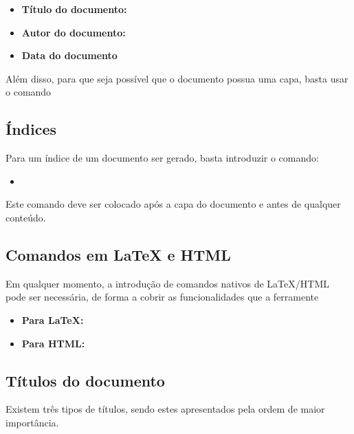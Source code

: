 \documentclass[11pt,a4paper]{article}
\begin{document}
\begin{itemize}
    \item \textbf{Título do documento:} 
        \verb@ %title Título @
    \item \textbf{Autor do documento:}
        \verb@ %author Autor @
    \item \textbf{Data do documento}
        \verb@ %date 02/04/2013 @
\end{itemize}

Além disso, para que seja possível que o documento possua uma capa, basta usar o comando \verb@ %cover% @, que em LaTeX diz respeito ao comando \verb@ \maketitle @, e em Html diz respeito a uma zona do documento onde terá toda esta informação.


\subsection{Índices}
Para um índice de um documento ser gerado, basta introduzir o comando:

\begin{itemize}
    \item \verb@ %index% @
\end{itemize}

Este comando deve ser colocado após a capa do documento e antes de qualquer conteúdo.
 

\subsection{Comandos em LaTeX e HTML}
Em qualquer momento, a introdução de comandos nativos de LaTeX/HTML pode ser necessária, de forma a cobrir as funcionalidades que a ferramente %

 \begin{itemize}
    \item \textbf{Para LaTeX:} 
        \verb@ %%latex% Comandos nativos em latex %latex%% @
    \item \textbf{Para HTML:}
        \verb@ %%html% Comandos nativos em html %html %% @
\end{itemize}


\subsection{Títulos do documento}
Existem três tipos de títulos, sendo estes apresentados pela ordem de maior importância.
\end{document}
